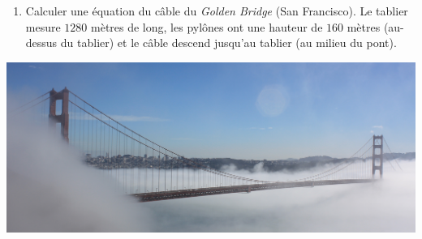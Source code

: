 \documentclass[class=report,crop=false]{standalone}
\begin{document}
\begin{exercicecours}
\begin{enumerate}
 \item Calculer une équation du câble du \emph{Golden Bridge} (San Francisco).
Le tablier mesure $1280$ mètres de long, les pylônes ont une hauteur de $160$ mètres (au-dessus
du tablier) et le câble descend jusqu'au tablier (au milieu du pont).

\bigskip

\shorthandoff{:}
\shorthandon{:}


\end{enumerate}

\end{exercicecours}

\bigskip

{\centering 
  \includegraphics[width=\textwidth]{figures/Golden_Gate_Bridge_by_Mark_Gunn.jpg} 
}


\bigskip
\bigskip


\finchapitre
\end{document}
